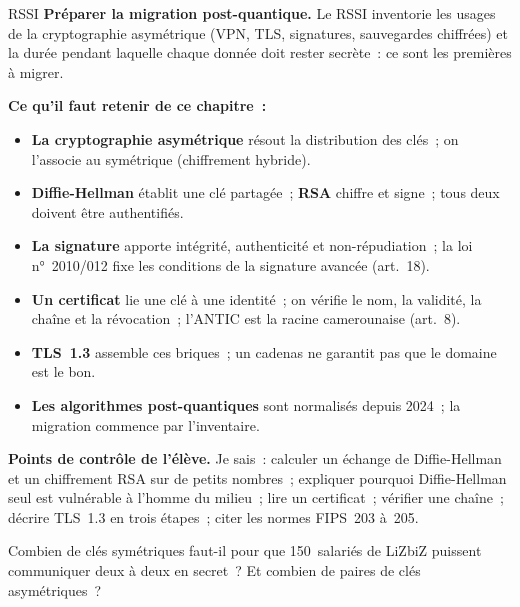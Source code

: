 \begin{boxmetier}{RSSI}
\textbf{Préparer la migration post-quantique.} Le RSSI inventorie les
usages de la cryptographie asymétrique (VPN, TLS, signatures,
sauvegardes chiffrées) et la durée pendant laquelle chaque donnée doit
rester secrète~: ce sont les premières à migrer.
\end{boxmetier}

\separateur

\begin{boxresume}
\textbf{Ce qu'il faut retenir de ce chapitre~:}
\begin{itemize}
    \item \textbf{La cryptographie asymétrique} résout la distribution des
          clés~; on l'associe au symétrique (chiffrement hybride).
    \item \textbf{Diffie-Hellman} établit une clé partagée~; \textbf{RSA}
          chiffre et signe~; tous deux doivent être authentifiés.
    \item \textbf{La signature} apporte intégrité, authenticité et
          non-répudiation~; la loi n°~2010/012 fixe les conditions de la
          signature avancée (art.~18).
    \item \textbf{Un certificat} lie une clé à une identité~; on vérifie le
          nom, la validité, la chaîne et la révocation~; l'ANTIC est la
          racine camerounaise (art.~8).
    \item \textbf{TLS~1.3} assemble ces briques~; un cadenas ne garantit pas
          que le domaine est le bon.
    \item \textbf{Les algorithmes post-quantiques} sont normalisés depuis
          2024~; la migration commence par l'inventaire.
\end{itemize}
\end{boxresume}

\begin{boxinfo}
\textbf{Points de contrôle de l'élève.} Je sais~: calculer un échange de
Diffie-Hellman et un chiffrement RSA sur de petits nombres~; expliquer
pourquoi Diffie-Hellman seul est vulnérable à l'homme du milieu~; lire
un certificat~; vérifier une chaîne~; décrire TLS~1.3 en trois étapes~;
citer les normes FIPS~203 à~205.
\end{boxinfo}

\bigskip

\begin{boxexo}[title={\ding{45}\quad Exercice~4.1. Nombre de clés \niveaubase}]
Combien de clés symétriques faut-il pour que 150~salariés de LiZbiZ
puissent communiquer deux à deux en secret~? Et combien de paires de clés
asymétriques~?
\end{boxexo}

